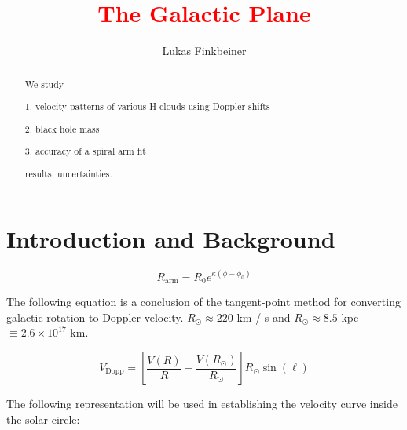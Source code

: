 \documentclass[12pt]{article}
\title{\textcolor{red}{The Galactic Plane}}
\author{Lukas Finkbeiner}
\begin{document}
\maketitle


\begin{abstract}


We study

1. velocity patterns of various H clouds using Doppler shifts

2. black hole mass

3. accuracy of a spiral arm fit

results, uncertainties.

\end{abstract}

\section{Introduction and Background}


\begin{equation} \label{eq:spiral}
R_\text{arm} = R_0 e^{\kappa(\phi - \phi_0)}
\end{equation}

The following equation is a conclusion of the tangent-point method for converting galactic rotation to Doppler velocity. $R_\odot \approx 220 $ km / s and $R_\odot \approx 8.5$ kpc $\equiv 2.6 \times 10^{17}$ km. 

\begin{equation} \label{eq:vel_dopp}
V_\text{Dopp} = \left[ \frac{V(R)}{R} - \frac{V(R_\odot)}{R_\odot} \right] R_\odot \sin(\ell)
\end{equation}



The following representation will be used in establishing the velocity curve inside the solar circle:
\end{document}
